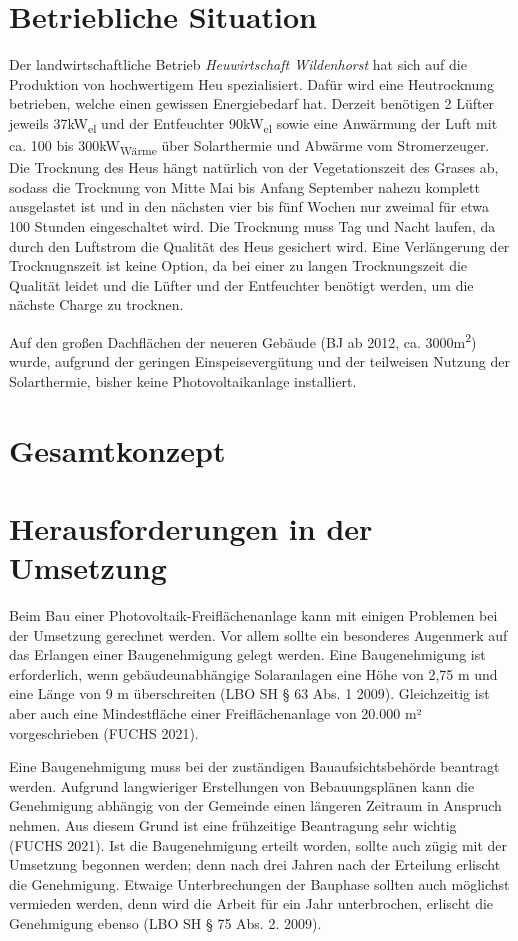 \documentclass[11pt]{scrartcl}
\begin{document}
\section{Betriebliche Situation}

Der landwirtschaftliche Betrieb \textit{Heuwirtschaft Wildenhorst} hat sich auf die Produktion von hochwertigem Heu spezialisiert.
Dafür wird eine Heutrocknung betrieben, welche einen gewissen Energiebedarf hat.
Derzeit benötigen 2 Lüfter jeweils 37kW\textsubscript{el} und der Entfeuchter 90kW\textsubscript{el} sowie eine Anwärmung der Luft mit ca. 100 bis 300kW\textsubscript{Wärme} über Solarthermie und Abwärme vom Stromerzeuger.
Die Trocknung des Heus hängt natürlich von der Vegetationszeit des Grases ab, sodass die Trocknung von Mitte Mai bis Anfang September nahezu komplett ausgelastet ist und in den nächsten vier bis fünf Wochen nur zweimal für etwa 100 Stunden eingeschaltet wird.
Die Trocknung muss Tag und Nacht laufen, da durch den Luftstrom die Qualität des Heus gesichert wird.
Eine Verlängerung der Trocknugnszeit ist keine Option, da bei einer zu langen Trocknungszeit die Qualität leidet und die Lüfter und der Entfeuchter benötigt werden, um die nächste Charge zu trocknen.

Auf den großen Dachflächen der neueren Gebäude (BJ ab 2012, ca. 3000m\textsuperscript{2}) wurde, aufgrund der geringen Einspeisevergütung und der teilweisen Nutzung der Solarthermie, bisher keine Photovoltaikanlage installiert.


\section{Gesamtkonzept}
\Blindtext

\section{Herausforderungen in der Umsetzung}
Beim Bau einer Photovoltaik-Freiflächenanlage kann mit einigen Problemen bei der Umsetzung gerechnet werden.
 Vor allem sollte ein besonderes Augenmerk auf das Erlangen einer Baugenehmigung gelegt werden.
 Eine Baugenehmigung ist erforderlich, wenn gebäudeunabhängige Solaranlagen eine Höhe von 2,75 m und eine Länge von 9 m überschreiten (LBO SH § 63 Abs. 1 2009).
 Gleichzeitig ist aber auch eine Mindestfläche einer Freiflächenanlage von 20.000 m² vorgeschrieben (FUCHS 2021).
 
Eine Baugenehmigung muss bei der zuständigen Bauaufsichtsbehörde beantragt werden.
 Aufgrund langwieriger Erstellungen von Bebauungsplänen kann die Genehmigung abhängig von der Gemeinde einen längeren Zeitraum in Anspruch nehmen.
 Aus diesem Grund ist eine frühzeitige Beantragung sehr wichtig (FUCHS 2021).
 Ist die Baugenehmigung erteilt worden, sollte auch zügig mit der Umsetzung begonnen werden; denn nach drei Jahren nach der Erteilung erlischt die Genehmigung.
 Etwaige Unterbrechungen der Bauphase sollten auch möglichst vermieden werden, denn wird die Arbeit für ein Jahr unterbrochen, erlischt die Genehmigung ebenso (LBO SH § 75 Abs. 2. 2009).
\end{document}
